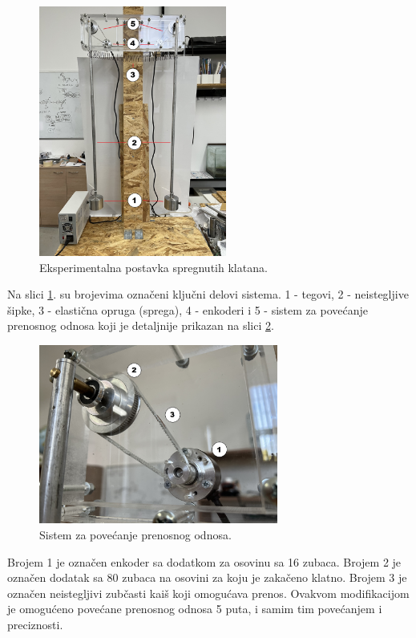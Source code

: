 \documentclass[a4paper, 12pt, diplomski]{etf}
\begin{document}
\begin{figure}[h!]
    \centering
    \includegraphics[angle=0,width=0.55\textwidth]{real/klatno2.jpeg}
    \caption{Eksperimentalna postavka spregnutih klatana.}
    \label{eksperiment1}
\end{figure}

\noindent
Na slici \ref{eksperiment1}. su brojevima označeni ključni delovi sistema. 1 - tegovi, 2 - neistegljive šipke, 3 - elastična opruga (sprega), 4 - enkoderi i 5 - sistem za povećanje prenosnog odnosa koji je detaljnije prikazan na slici \ref{prenos}.


\begin{figure}[h!]
    \centering
    \includegraphics[angle=0,width=0.7\textwidth]{real/prenos2.jpeg}
    \caption{Sistem za povećanje prenosnog odnosa.}
    \label{prenos}
\end{figure}

\noindent
Brojem 1 je označen enkoder sa dodatkom za osovinu sa 16 zubaca. Brojem 2 je označen dodatak sa 80 zubaca na osovini za koju je zakačeno klatno.  Brojem 3 je označen neistegljivi zubčasti kaiš koji omogućava prenos. Ovakvom modifikacijom je omogućeno povećane prenosnog odnosa 5 puta, i samim tim povećanjem i preciznosti.
\end{document}

